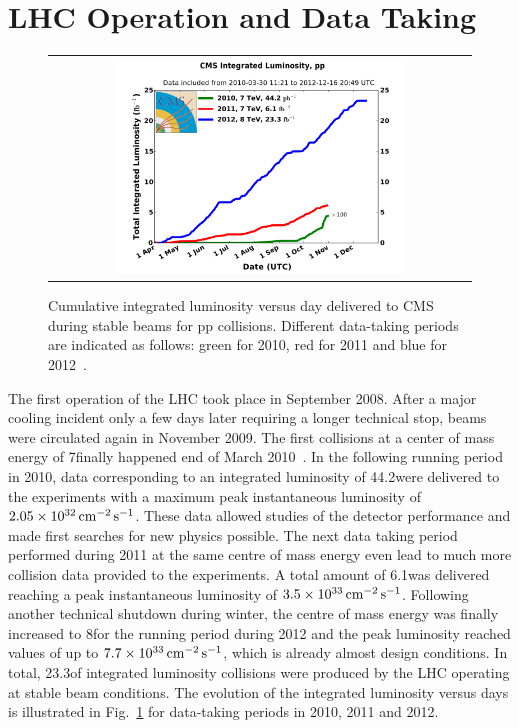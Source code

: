 \section{LHC Operation and Data Taking}
\label{sec:data}
\begin{figure}[!t]
  \centering
  \begin{tabular}{c}
    \includegraphics[width=0.7\textwidth]{figures/int_lumi_cumulative_pp_2.pdf}
  \end{tabular}
  \caption{Cumulative integrated luminosity versus day delivered to CMS during stable beams for pp collisions. Different data-taking periods are indicated as follows: green for 2010, red for 2011 and blue for 2012~\cite{bib:lhc:lumi12}.}
  \label{fig:lhc_data}
\end{figure}
The first operation of the LHC took place in September 2008. After a major cooling incident only a few days later requiring a longer technical stop, beams were circulated again in November 2009. The first collisions at a center of mass energy of 7\tev finally happened end of March 2010~\cite{bib:lhcmachineoutreach}. In the following running period in 2010, data corresponding to an integrated luminosity of 44.2\pbinv were delivered to the experiments with a maximum peak instantaneous luminosity of $2.05 \times 10^{32} \,\text{cm}^{-2} \,\text{s}^{-1}$. These data allowed studies of the detector performance and made first searches for new physics possible. The next data taking period performed during 2011 at the same centre of mass energy even lead to much more \pp collision data provided to the experiments. A total amount of 6.1\fbinv was delivered reaching a peak instantaneous luminosity of $3.5 \times 10^{33} \,\text{cm}^{-2} \,\text{s}^{-1}$. Following another technical shutdown during winter, the centre of mass energy was finally increased to 8\tev for the running period during 2012 and the peak luminosity reached values of up to $7.7 \times 10^{33} \,\text{cm}^{-2} \,\text{s}^{-1}$, which is already almost design conditions. In total, 23.3\fbinv of integrated luminosity \pp collisions were produced by the LHC operating at stable beam conditions. The evolution of the integrated luminosity versus days is illustrated in Fig.~\ref{fig:lhc_data} for data-taking periods in 2010, 2011 and 2012. \\
